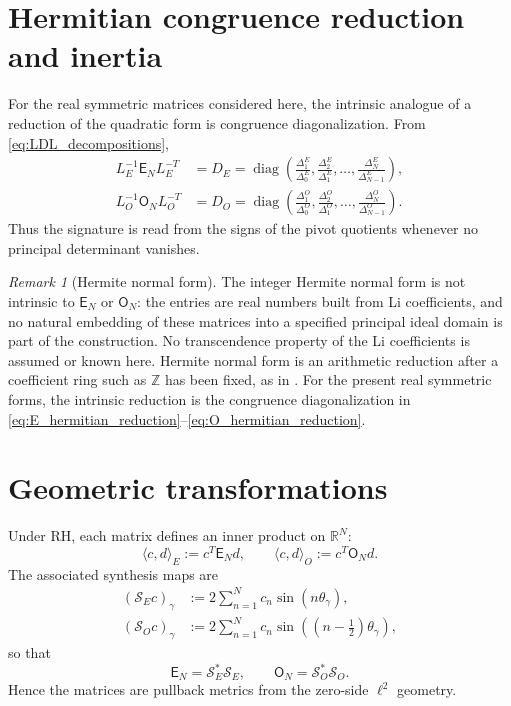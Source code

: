 \documentclass[11pt]{amsart}
\numberwithin{equation}{section}
\theoremstyle{plain}
\theoremstyle{definition}
\theoremstyle{remark}
\newtheorem{remark}[theorem]{Remark}
\newcommand{\RH}{\mathrm{RH}}
\newcommand{\E}{\mathsf E}
\newcommand{\Omat}{\mathsf O}
\newcommand{\diag}{\operatorname{diag}}
\begin{document}
\section{Hermitian congruence reduction and inertia}
\label{sec:hermitian_reduction}

For the real symmetric matrices considered here, the intrinsic analogue of a reduction of the quadratic form is congruence diagonalization. From \eqref{eq:LDL_decompositions},
\begin{align}
L_E^{-1}\E_NL_E^{-T}
&=D_E
=\diag\left(
\frac{\Delta_1^E}{\Delta_0^E},
\frac{\Delta_2^E}{\Delta_1^E},\ldots,
\frac{\Delta_N^E}{\Delta_{N-1}^E}
\right),
\label{eq:E_hermitian_reduction}\\
L_O^{-1}\Omat_NL_O^{-T}
&=D_O
=\diag\left(
\frac{\Delta_1^O}{\Delta_0^O},
\frac{\Delta_2^O}{\Delta_1^O},\ldots,
\frac{\Delta_N^O}{\Delta_{N-1}^O}
\right).
\label{eq:O_hermitian_reduction}
\end{align}
Thus the signature is read from the signs of the pivot quotients whenever no principal determinant vanishes.

\begin{remark}[Hermite normal form]
\label{rem:HNF}
The integer Hermite normal form is not intrinsic to $\E_N$ or $\Omat_N$: the entries are real numbers built from Li coefficients, and no natural embedding of these matrices into a specified principal ideal domain is part of the construction. No transcendence property of the Li coefficients is assumed or known here. Hermite normal form is an arithmetic reduction after a coefficient ring such as $\mathbb Z$ has been fixed, as in \cite{KannanBachem1979}. For the present real symmetric forms, the intrinsic reduction is the congruence diagonalization in \eqref{eq:E_hermitian_reduction}--\eqref{eq:O_hermitian_reduction}.
\end{remark}

\section{Geometric transformations}
\label{sec:geometry}

Under $\RH$, each matrix defines an inner product on $\mathbb R^N$:
\begin{equation}
\langle c,d\rangle_{E}:=c^T\E_Nd,
\qquad
\langle c,d\rangle_{O}:=c^T\Omat_Nd.
\label{eq:matrix_inner_products}
\end{equation}
The associated synthesis maps are
\begin{align}
(\mathcal S_Ec)_\gamma
&:=2\sum_{n=1}^{N}c_n\sin(n\theta_\gamma),
\label{eq:SE_synthesis}\\
(\mathcal S_Oc)_\gamma
&:=2\sum_{n=1}^{N}c_n\sin((n-\tfrac12)\theta_\gamma),
\label{eq:SO_synthesis}
\end{align}
so that
\begin{equation}
\E_N=\mathcal S_E^*\mathcal S_E,
\qquad
\Omat_N=\mathcal S_O^*\mathcal S_O.
\label{eq:synthesis_gram}
\end{equation}
Hence the matrices are pullback metrics from the zero-side $\ell^2$ geometry.
\end{document}
